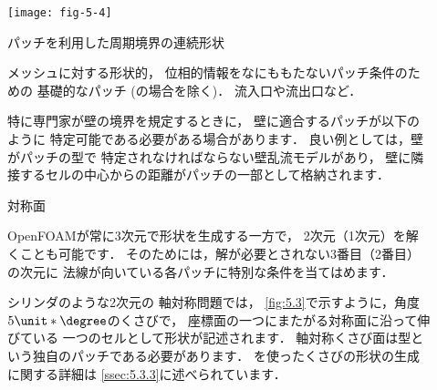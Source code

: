 \begin{figure}[ht]
 \texttt{[image: fig-5-4]}
 \caption{パッチを利用した周期境界の連続形状}
 \label{fig:5.4}
\end{figure}


\begin{description}
 \item[]
%
%
            メッシュに対する形状的，
            位相的情報をなにももたないパッチ条件のための
            基礎的なパッチ (の場合を除く)．
            流入口や流出口など．
 \item[]
%
%
            特に専門家が壁の境界を規定するときに，
            壁に適合するパッチが以下のように
            特定可能である必要がある場合があります．
            良い例としては，壁がパッチの型で
            特定されなければならない壁乱流モデルがあり，
            壁に隣接するセルの中心からの距離がパッチの一部として格納されます．
 \item[]
%
%
            対称面
 \item[]
%
%
            OpenFOAMが常に3次元で形状を生成する一方で，
            2次元（1次元）を解くことも可能です．
            そのためには，解が必要とされない3番目（2番目）の次元に
            法線が向いている各パッチに特別な条件を当てはめます．
 \item[]
%
%
            シリンダのような2次元の%
%
            軸対称問題では，
            \autoref{fig:5.3}で示すように，角度$5\unit*{\degree}$のくさびで，
            座標面の一つにまたがる対称面に沿って伸びている
            一つのセルとして形状が記述されます．
            軸対称くさび面は型という独自のパッチである必要があります．
            を使ったくさびの形状の生成に関する詳細は
            \autoref{ssec:5.3.3}に述べられています．

\end{description}
